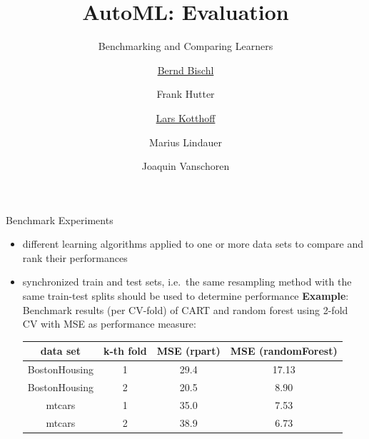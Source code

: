 


\usepackage{multirow}


\title[AutoML: Risks]{AutoML: Evaluation} %
\subtitle{Benchmarking and Comparing Learners} %
\author[Lars Kotthoff]{\underline{Bernd Bischl} \and Frank Hutter \and \underline{Lars Kotthoff}\newline \and Marius Lindauer \and Joaquin Vanschoren}
\institute{}
\date{}

\newcommand\reffootnote[1]{%
    \begingroup
    \renewcommand\thefootnote{}\footnote{
        \tiny #1
    \vspace*{1em}}%
    \addtocounter{footnote}{-1}%
    \endgroup
}



	
	\maketitle

    \begin{frame}[c]{Benchmark Experiments}

    \begin{itemize}
    \item different learning algorithms applied to one or more data sets to compare and rank their performances
    \item synchronized train and test sets, i.e.\ the same resampling method
        with the same train-test splits should be used to determine performance
    \newline
    \textbf{Example}: Benchmark results (per CV-fold) of CART and random forest using 2-fold CV with MSE as performance measure:
    \medskip

    \begin{center}
        \scriptsize
        \begin{tabular}{cccc}
        \toprule
        data set & k-th fold & MSE (rpart) & MSE (randomForest)\\
        \midrule
        BostonHousing & 1 & 29.4 & 17.13\\
        BostonHousing & 2 & 20.5 & 8.90\\
        mtcars & 1 & 35.0 & 7.53\\
        mtcars & 2 & 38.9 & 6.73\\
        \bottomrule
        \end{tabular}
    \end{center}
    \end{itemize}

    \end{frame}

